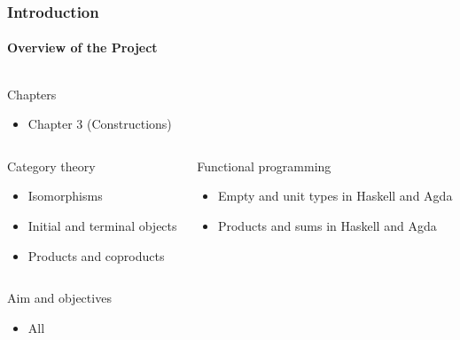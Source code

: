 \documentclass{beamer}
\begin{document}

\begin{frame}[label={chap:constructions}]
  \frametitle{Introduction}
  \framesubtitle{Overview of the Project}

  \begin{columns}[onlytextwidth,t]
    \begin{column}{\textwidth}
      \begin{block}{Chapters}
        \begin{itemize}
        \item Chapter 3 (Constructions)
        \end{itemize}
      \end{block}
    \end{column}
  \end{columns}
  \begin{columns}[onlytextwidth,t]
    \begin{column}{.5\textwidth}
      \begin{block}{Category theory}
        \begin{itemize}
        \item Isomorphisms
        \item Initial and terminal objects
        \item Products and coproducts
        \end{itemize}
      \end{block}
    \end{column}
    \begin{column}{.5\textwidth}
      \begin{block}{Functional programming}
        \begin{itemize}
        \item Empty and unit types in Haskell and Agda
        \item Products and sums in Haskell and Agda
        \end{itemize}
      \end{block}
    \end{column}
  \end{columns}
  \begin{columns}[onlytextwidth,t]
    \begin{column}{\textwidth}
      \begin{block}{Aim and objectives}
        \begin{itemize}
        \item All
        \end{itemize}
      \end{block}
    \end{column}
  \end{columns}

\end{frame}
\end{document}
